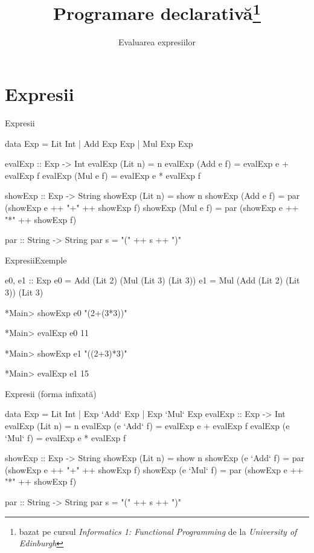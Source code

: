 \documentclass[xcolor=pdftex,romanian,colorlinks]{beamer}
\title[PD---Tipuri date algebrice]{Programare declarativă\thanks{bazat pe cursul \emph{Informatics 1: Functional Programming} de la \emph{University of Edinburgh}}}
\subtitle{Evaluarea expresiilor}
\begin{document}
\begin{frame}
  \titlepage
\end{frame}

\section{Expresii}

\begin{frame}[fragile]{Expresii}
\begin{asciihs}
  data Exp    =   Lit Int
              |   Add Exp Exp
              |   Mul Exp Exp

  evalExp    :: Exp -> Int
  evalExp    (Lit n)    = n
  evalExp    (Add e f) = evalExp e + evalExp f
  evalExp    (Mul e f) = evalExp e * evalExp f

  showExp    :: Exp -> String
  showExp    (Lit n)    = show n
  showExp    (Add e f) = par (showExp e ++ "+" ++ showExp f)
  showExp    (Mul e f) = par (showExp e ++ "*" ++ showExp f)

  par :: String -> String
  par s = "(" ++ s ++ ")"
\end{asciihs}
\end{frame}
\begin{frame}[fragile]{Expresii}{Exemple}
\begin{asciihs}
  e0, e1 :: Exp
  e0 = Add (Lit 2) (Mul (Lit 3) (Lit 3))
  e1 = Mul (Add (Lit 2) (Lit 3)) (Lit 3)

  *Main> showExp e0
  "(2+(3*3))"

  *Main> evalExp e0
  11

  *Main> showExp e1
  "((2+3)*3)"

  *Main> evalExp e1
  15
\end{asciihs}
\end{frame}
\begin{frame}[fragile]{Expresii (forma infixată)}
\begin{asciihs}

data   Exp   =   Lit Int
             |   Exp `Add` Exp
             |   Exp `Mul` Exp
evalExp :: Exp -> Int
evalExp (Lit n)     = n
evalExp (e `Add` f) =    evalExp e + evalExp f
evalExp (e `Mul` f) =    evalExp e * evalExp f

showExp :: Exp -> String
showExp (Lit n)     = show n
showExp (e `Add` f) = par (showExp e ++ "+" ++ showExp f)
showExp (e `Mul` f) = par (showExp e ++ "*" ++ showExp f)

par :: String -> String
par s = "(" ++ s ++ ")"
\end{asciihs}
\end{frame}
\end{document}
